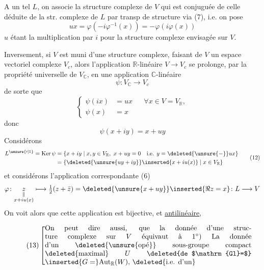 A un tel $L$, on associe la structure complexe de   $V$ qui est conjuguée de celle déduite de la str. complexe de $L$ par transp de structure via (7), i.e. on pose
\[
 ux=\varphi(-i\varphi^{-1}(x))=-\varphi(i\varphi(x)) \tag*{(8)}
\]
$u$ étant la multiplication par $i$ pour la structure complexe envisagée sur $V$.


Inversement, si $V$ est muni d'une structure complexe,  faisant de $V$ un espace vectoriel complexe $V_c$, alors l'application  $\mathbb R$-linéaire $V\longrightarrow V_c$ se prolonge, par la propriété universelle de $V_{\mathbb C}$, en une application $\mathbb C$-linéaire
\[
 \psi\colon V_{\mathbb C}\longrightarrow V_c \tag*{(9)}
\]
de sorte que
\[
 \left\{\begin{aligned}\psi(ix)&=ux&&\forall x\in V=V_{\mathbb R},\\ \psi(x)&=x\end{aligned}\right. \tag*{(10)}
\]
donc
\[
 \psi(x+iy)=x+uy \tag*{(11)}
\]
  Considérons
\[
 \begin{aligned}
 L^{\unsure{\prime|1}}=\mathrm{Ker}\,\psi
 &=\{x+iy\mid x,y\in V_{\mathbb R},\ x+uy=0\quad\text{i.e. }y=\deleted{\unsure{-}}ux\}\\
 &=\{\deleted{\unsure{uy+iy}}\inserted{x+iu(x)}\mid x\in V_{\mathbb R}\}
 \end{aligned}\tag*{(12)}
\]
et considérons l'application correspondante (6)
\[
 \varphi\colon\underset{\substack{\Vert\\x+iu(x)}}{z}\longmapsto\tfrac12(z+\bar z)=\deleted{\unsure{x+uy}}\inserted{\Re z=x}\colon L\longrightarrow V
\]
On voit alors que cette application est bijective, et \uline{antilinéaire},  

\[
 \tag*{(13)}
 \left[\begin{minipage}{0.84\linewidth}
 On peut dire aussi, que la donnée d'une structure complexe sur $V$ équivaut à

 $1^\circ$) La donnée d'un \deleted{\unsure{opé}} sous-groupe compact \deleted{maximal} $U$ \deleted{de $\mathrm{Gl}=$} $\inserted{G=}\mathrm{Aut}_{\mathbb R}(W)$, \deleted{i.e. d'un}
 \end{minipage}\right.
\]
